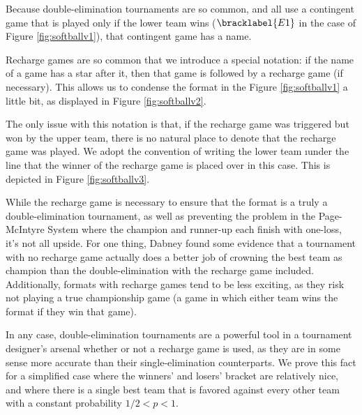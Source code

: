 {    Because double-elimination tournaments are so common, and all use a contingent game that is played only if the lower team wins ($\bracklabel{E1}$ in the case of Figure \ref{fig:softballv1}), that contingent game has a name.


    Recharge games are so common that we introduce a special notation: if the name of a game has a star after it, then that game is followed by a recharge game (if necessary). This allows us to condense the format in the Figure \ref{fig:softballv1} a little bit, as displayed in Figure \ref{fig:softballv2}.


    The only issue with this notation is that, if the recharge game was triggered but won by the upper team, there is no natural place to denote that the recharge game was played. We adopt the convention of writing the lower team \i{under} the line that the winner of the recharge game is placed over in this case. This is depicted in Figure \ref{fig:softballv3}.
    

    While the recharge game is necessary to ensure that the format is a truly a double-elimination tournament, as well as preventing the problem in the Page-McIntyre System where the champion and runner-up each finish with one-loss, it's not all upside. For one thing, Dabney \cite{recharge_rounds} found some evidence that a tournament with no recharge game actually does a better job of crowning the best team as champion than the double-elimination with the recharge game included. Additionally, formats with recharge games tend to be less exciting, as they risk not playing a true championship game (a game in which either team wins the format if they win that game).

    In any case, double-elimination tournaments are a powerful tool in a tournament designer's arsenal whether or not a recharge game is used, as they are in some sense more accurate than their single-elimination counterparts. We prove this fact for a simplified case where the winners' and losers' bracket are relatively nice, and where there is a single best team that is favored against every other team with a constant probability $1/2 < p < 1$.

}
